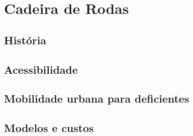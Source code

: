\chapter[Cadeira de Rodas]{Cadeira de Rodas\label{cap:cadeiraRodas}}

\section{História}
\section{Acessibilidade}
\section{Mobilidade urbana para deficientes}
\section{Modelos e custos}
